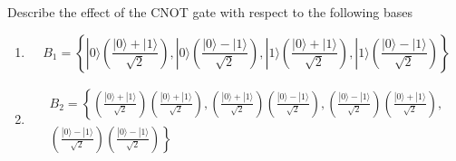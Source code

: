 \documentclass[12pt]{article}
\newenvironment{problem}[2][Problem]{\begin{trivlist}
\item[\hskip \labelsep {\bfseries #1}\hskip \labelsep {\bfseries #2.}]}{\end{trivlist}}
\begin{document}
\begin{problem}{4.2.4}
Describe the effect of the CNOT gate with respect to the following bases
\begin{enumerate}[label=(\alph*)]
\item $$B_1=\left\lbrace|0\rangle\left(\frac{|0\rangle+|1\rangle}{\sqrt{2}}\right), |0\rangle\left(\frac{|0\rangle-|1\rangle}{\sqrt{2}}\right), |1\rangle\left(\frac{|0\rangle+|1\rangle}{\sqrt{2}}\right), |1\rangle\left(\frac{|0\rangle-|1\rangle}{\sqrt{2}}\right)\right\rbrace$$
\item \begin{multline}
B_2=\left\lbrace\left(\frac{|0\rangle+|1\rangle}{\sqrt{2}}\right)\left(\frac{|0\rangle+|1\rangle}{\sqrt{2}}\right), \left(\frac{|0\rangle+|1\rangle}{\sqrt{2}}\right)\left(\frac{|0\rangle-|1\rangle}{\sqrt{2}}\right), \left(\frac{|0\rangle-|1\rangle}{\sqrt{2}}\right)\left(\frac{|0\rangle+|1\rangle}{\sqrt{2}}\right),\right. \\ \left.
\left(\frac{|0\rangle-|1\rangle}{\sqrt{2}}\right)\left(\frac{|0\rangle-|1\rangle}{\sqrt{2}}\right)\right\rbrace
\end{multline}
\end{enumerate}
\end{problem}
\end{document}
